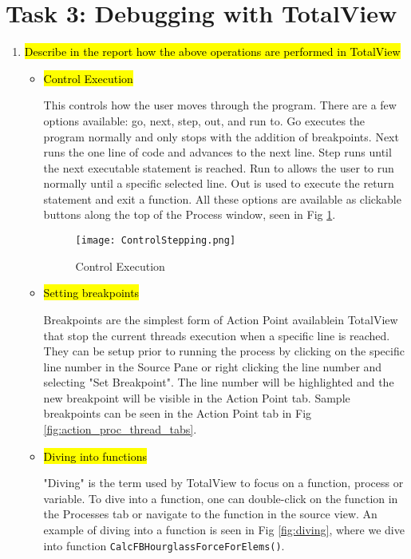 \documentclass{article}
\begin{document}
\section{Task 3: Debugging with TotalView}
\begin{enumerate}
\item \hl{Describe in the report how the above operations are performed in TotalView}
	\begin{itemize}
	\item \hl{Control Execution}
	
	This controls how the user moves through the program. 
	There are a few options available: go, next, step, out, and run to. 
	Go executes the program normally and only stops with the addition of breakpoints. 
	Next runs the one line of code and advances to the next line. 
	Step runs until the next executable statement is reached. 
	Run to allows the user to run normally until a specific selected line. 
	Out is used to execute the return statement and exit a function. 
	All these options are available as clickable buttons along the top of the Process window, seen in Fig \ref{fig:stepping}.
		\begin{figure}[p] %
		\begin{center}
			\texttt{[image: ControlStepping.png]}
		\caption{Control Execution}
		\label{fig:stepping}
		\end{center}
	\end{figure}
	\item \hl{Setting breakpoints}
	
	Breakpoints are the simplest form of Action Point availablein TotalView that stop the current threads execution when a specific line is reached. 
	They can be setup prior to running the process by clicking on the specific line number in the Source Pane or right clicking the line number and selecting "Set Breakpoint". 
	The line number will be highlighted and the new breakpoint will be visible in the Action Point tab.
	 Sample breakpoints can be seen in the Action Point tab in Fig \ref{fig:action_proc_thread_tabs}.
	\item \hl{Diving into functions}
	
	"Diving" is the term used by TotalView to focus on a function, process or variable. 
	To dive into a function, one can double-click on the function in the Processes tab or navigate to the function in the source view. 
	An example of diving into a function is seen in Fig \ref{fig:diving}, where we dive into function \verb!CalcFBHourglassForceForElems()!.
	

\end{itemize}
\end{enumerate}
\end{document}

